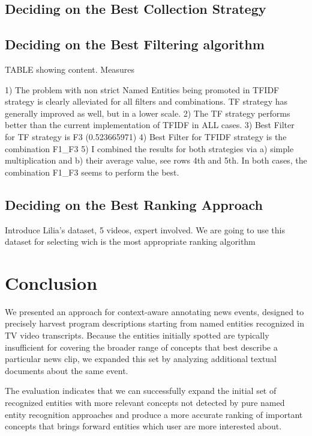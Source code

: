 \documentclass{llncs}
\begin{document}
\subsection{Deciding on the Best Collection Strategy}

\subsection{Deciding on the Best Filtering algorithm}
\label{sec:FilteringExperiments}

TABLE showing content. Measures

1) The problem with non strict Named Entities being promoted in TFIDF strategy is clearly alleviated for all filters and combinations. TF strategy has generally improved as well, but in a lower scale.
2) The TF strategy performs better than the current implementation of TFIDF in ALL cases.
3) Best Filter for TF strategy is F3 (0.523665971)
4) Best Filter for TFIDF strategy is the combination F1\_F3
5) I combined the results for both strategies via a) simple multiplication and b) their average value, see rows 4th and 5th. In both cases, the combination F1\_F3 seems to perform the best.

\subsection{Deciding on the Best Ranking Approach}
\label{sec:decidingRanking}

Introduce Lilia's dataset, 5 videos, expert involved. We are going to use this dataset for selecting wich is the most appropriate ranking algorithm


\section{Conclusion}
\label{sec:conclusion}
We presented an approach for context-aware annotating news events, designed to precisely harvest program descriptions starting from named entities recognized in TV video transcripts. Because the entities initially spotted are typically insufficient for covering the broader range of concepts that best describe a particular news clip, we expanded this set by analyzing additional textual documents about the same event.

The evaluation indicates that we can successfully expand the initial set of recognized entities with more relevant concepts not detected by pure named entity recognition approaches and produce a more accurate ranking of important concepts that brings forward entities which user are more interested about.
\end{document}
